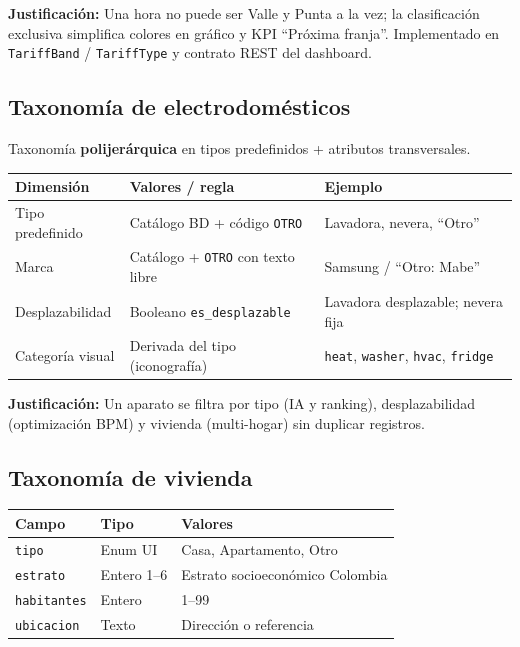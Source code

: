 \documentclass[11pt,a4paper]{article}
\begin{document}
\textbf{Justificación:} Una hora no puede ser Valle y Punta a la vez; la clasificación exclusiva simplifica colores en gráfico y KPI ``Próxima franja''. Implementado en \texttt{TariffBand} / \texttt{TariffType} y contrato REST del dashboard.

\subsection{Taxonomía de electrodomésticos}

Taxonomía \textbf{polijerárquica} en tipos predefinidos + atributos transversales.

\begin{table}[H]
\centering
\small
\begin{tabularx}{\textwidth}{@{}L{2.8cm}L{5.5cm}Y@{}}
\toprule
\textbf{Dimensión} & \textbf{Valores / regla} & \textbf{Ejemplo} \\
\midrule
Tipo predefinido & Catálogo BD + código \texttt{OTRO} & Lavadora, nevera, ``Otro'' \\
Marca & Catálogo + \texttt{OTRO} con texto libre & Samsung / ``Otro: Mabe'' \\
Desplazabilidad & Booleano \texttt{es\_desplazable} & Lavadora desplazable; nevera fija \\
Categoría visual & Derivada del tipo (iconografía) & \texttt{heat}, \texttt{washer}, \texttt{hvac}, \texttt{fridge} \\
\bottomrule
\end{tabularx}
\end{table}

\textbf{Justificación:} Un aparato se filtra por tipo (IA y ranking), desplazabilidad (optimización BPM) y vivienda (multi-hogar) sin duplicar registros.

\subsection{Taxonomía de vivienda}

\begin{table}[H]
\centering
\small
\begin{tabular}{@{}L{2.5cm}L{2.5cm}L{7cm}@{}}
\toprule
\textbf{Campo} & \textbf{Tipo} & \textbf{Valores} \\
\midrule
\texttt{tipo} & Enum UI & Casa, Apartamento, Otro \\
\texttt{estrato} & Entero 1--6 & Estrato socioeconómico Colombia \\
\texttt{habitantes} & Entero & 1--99 \\
\texttt{ubicacion} & Texto & Dirección o referencia \\
\bottomrule
\end{tabular}
\end{table}
\end{document}
